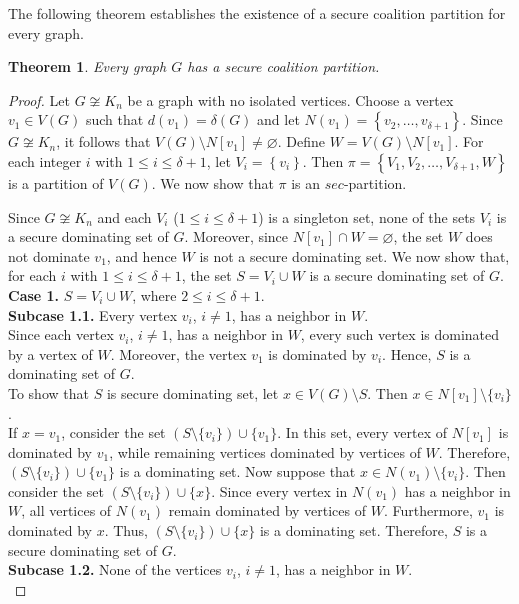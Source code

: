 \documentclass[12pt]{article}
\newtheorem{theorem}{Theorem}[section]
\begin{document}
   The following theorem establishes the existence of a secure coalition partition for every graph.
 \begin{theorem}\label{mindelta2}
 Every graph $G$ has a secure coalition partition.
    \end{theorem}
    \begin{proof}
    Let $G \not\cong K_n$ be a graph with no isolated vertices. Choose a vertex $v_1 \in V(G)$ such that $d(v_1)=\delta(G)$ and let $N(v_1)=\left\{v_2,\ldots,v_{\delta+1}\right\}$. Since $G\not\cong K_n$, it follows that $V(G)\setminus N[v_1]\neq \varnothing$.
Define $W=V(G)\setminus N[v_1]$. For each integer $i$ with $1\le i\le \delta+1$, let $V_i=\left\{v_i\right\}$. Then $\pi=\left\{V_1,V_2,\ldots,V_{\delta+1},W\right\}$ is a partition of $V(G)$.
We now show that $\pi$ is an $sec$-partition.\par
Since $G\not\cong K_n$ and each $V_i$ ($1\le i\le \delta+1$) is a singleton set, none of the sets $V_i$ is a secure dominating set of $G$. Moreover, since $N[v_1]\cap W=\varnothing$, the set $W$ does not dominate $v_1$, and hence $W$ is not a secure dominating set. We now show that, for each $i$ with $1\le i\le \delta+1$, the set $S=V_i\cup W$ is a secure dominating set of $G$.\\
\textbf{Case 1.} $S=V_i\cup W$, where $2\le i\le \delta+1$.\\
\textbf{Subcase 1.1.} Every vertex $v_i$, $i\neq 1$, has a neighbor in $W$.\\
Since each vertex $v_i$, $i\neq 1$, has a neighbor in $W$, every such vertex is dominated by a vertex of $W$. Moreover, the vertex $v_1$ is dominated by $v_i$. Hence, $S$ is a dominating set of $G$.\\
To show that $S$ is secure dominating set, let $x\in V(G)\setminus S$. Then $x\in N[v_1]\setminus\{v_i\}$.\\ If $x=v_1$, consider the set $(S\setminus\{v_i\})\cup\{v_1\}$.
In this set, every vertex of $N[v_1]$ is dominated by $v_1$, while remaining vertices dominated by vertices of $W$. Therefore, $(S\setminus\{v_i\})\cup\{v_1\}$ is a dominating set. Now suppose that $x\in N(v_1)\setminus\{v_i\}$. Then consider the set
$(S\setminus\{v_i\})\cup\{x\}$. Since every vertex in $N(v_1)$ has a neighbor in $W$, all vertices of $N(v_1)$ remain dominated by vertices of $W$. Furthermore, $v_1$ is dominated by $x$. Thus,
$(S\setminus\{v_i\})\cup\{x\}$ is a dominating set. Therefore,  $S$ is a secure dominating set of $G$.\\[2mm]
\textbf{Subcase 1.2.} None of the vertices $v_i$, $i\neq 1$, has a neighbor in $W$.\\

\end{proof}
\end{document}
